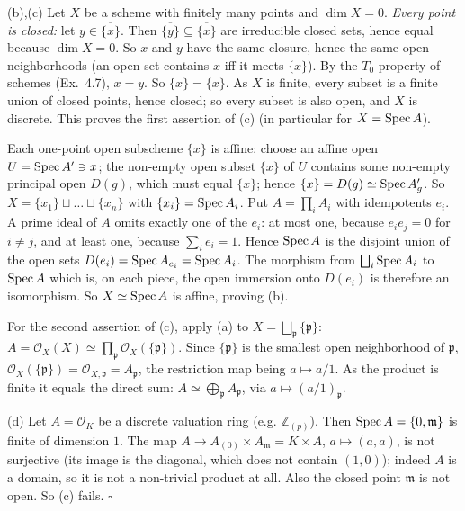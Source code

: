 \documentclass[11pt]{article}
\begin{document}
(b),(c) Let $X$ be a scheme with finitely many points and $\dim X=0$. \emph{Every point is closed:} let $y\in\overline{\{x\}}$. Then $\overline{\{y\}}\subseteq\overline{\{x\}}$ are irreducible closed sets, hence equal because $\dim X=0$. So $x$ and $y$ have the same closure, hence the same open neighborhoods (an open set contains $x$ iff it meets $\overline{\{x\}}$). By the $T_0$ property of schemes (Ex.~4.7), $x=y$. So $\overline{\{x\}}=\{x\}$. As $X$ is finite, every subset is a finite union of closed points, hence closed; so every subset is also open, and $X$ is discrete. This proves the first assertion of (c) (in particular for $X=\operatorname{Spec} A$).

Each one-point open subscheme $\{x\}$ is affine: choose an affine open $U=\operatorname{Spec} A'\ni x$; the non-empty open subset $\{x\}$ of $U$ contains some non-empty principal open $D(g)$, which must equal $\{x\}$; hence $\{x\}=D(g)\simeq\operatorname{Spec} A'_g$. So $X=\{x_1\}\sqcup\dots\sqcup\{x_n\}$ with $\{x_i\}=\operatorname{Spec} A_i$. Put $A=\prod_iA_i$ with idempotents $e_i$. A prime ideal of $A$ omits exactly one of the $e_i$: at most one, because $e_ie_j=0$ for $i\ne j$, and at least one, because $\sum_ie_i=1$. Hence $\operatorname{Spec} A$ is the disjoint union of the open sets $D(e_i)=\operatorname{Spec} A_{e_i}=\operatorname{Spec} A_i$. The morphism from $\bigsqcup_i\operatorname{Spec} A_i$ to $\operatorname{Spec} A$ which is, on each piece, the open immersion onto $D(e_i)$ is therefore an isomorphism. So $X\simeq\operatorname{Spec} A$ is affine, proving (b).

For the second assertion of (c), apply (a) to $X=\bigsqcup_{\mathfrak p}\{\mathfrak p\}$: $A=\mathcal O_X(X)\simeq\prod_{\mathfrak p}\mathcal O_X(\{\mathfrak p\})$. Since $\{\mathfrak p\}$ is the smallest open neighborhood of $\mathfrak p$, $\mathcal O_X(\{\mathfrak p\})=\mathcal O_{X,\mathfrak p}=A_{\mathfrak p}$, the restriction map being $a\mapsto a/1$. As the product is finite it equals the direct sum: $A\simeq\bigoplus_{\mathfrak p}A_{\mathfrak p}$, via $a\mapsto(a/1)_{\mathfrak p}$.

(d) Let $A=\mathcal O_K$ be a discrete valuation ring (e.g. $\mathbb Z_{(p)}$). Then $\operatorname{Spec} A=\{0,\mathfrak m\}$ is finite of dimension $1$. The map $A\to A_{(0)}\times A_{\mathfrak m}=K\times A$, $a\mapsto(a,a)$, is not surjective (its image is the diagonal, which does not contain $(1,0)$); indeed $A$ is a domain, so it is not a non-trivial product at all. Also the closed point $\mathfrak m$ is not open. So (c) fails. \hfill$\square$
\end{document}

